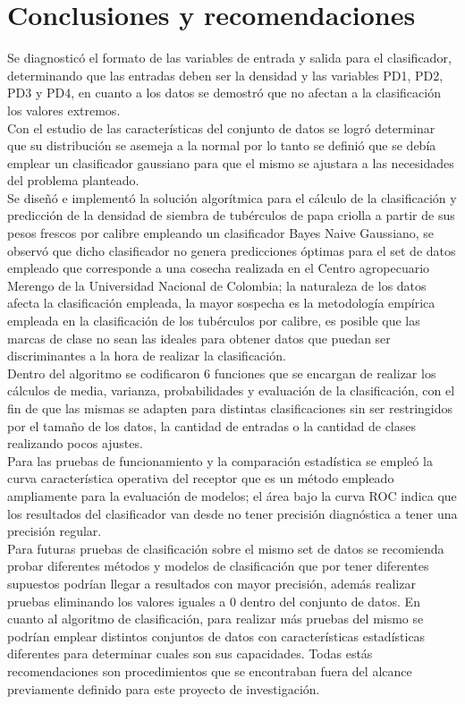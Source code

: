 \chapter{Conclusiones y recomendaciones}

Se diagnosticó el formato de las variables de entrada y salida para el clasificador, determinando que las entradas deben ser la densidad y las variables PD1, PD2, PD3 y PD4, en cuanto a los datos se demostró que no afectan a la clasificación los valores extremos.\\

Con el estudio de las características del conjunto de datos se logró determinar que su distribución se asemeja a la normal por lo tanto se definió que se debía emplear un clasificador gaussiano para que el mismo se ajustara a las necesidades del problema planteado.\\

Se diseñó e implementó la solución algorítmica para el cálculo de la clasificación y predicción de la densidad de siembra de tubérculos de papa criolla a partir de sus pesos frescos por calibre empleando un clasificador Bayes Naive Gaussiano, se observó que dicho clasificador no genera predicciones
óptimas para el set de datos empleado que corresponde a una cosecha realizada en el Centro agropecuario Merengo de la Universidad Nacional de Colombia; la naturaleza de los datos afecta la clasificación empleada, la mayor sospecha es la metodología empírica empleada en la clasificación de los tubérculos por calibre, es posible que las marcas de clase no sean las ideales para obtener datos que puedan ser discriminantes a la hora de realizar la clasificación.\\

Dentro del algoritmo se codificaron 6 funciones que se encargan de realizar los cálculos de media, varianza, probabilidades y evaluación de la clasificación, con el fin de que las mismas se adapten para distintas clasificaciones sin ser restringidos por el tamaño de los datos, la cantidad de entradas o la cantidad de clases realizando pocos ajustes.\\

Para las pruebas de funcionamiento y la comparación estadística se empleó la curva característica operativa del receptor que es un método empleado ampliamente para la evaluación de modelos; el área bajo la curva ROC
indica que los resultados del clasificador van desde no tener precisión diagnóstica a tener una precisión regular.\\

Para futuras pruebas de clasificación sobre el mismo set de datos se recomienda probar diferentes métodos y modelos de clasificación que por tener diferentes supuestos podrían llegar a resultados con mayor precisión, además realizar pruebas eliminando los valores iguales a 0 dentro del conjunto de datos. En cuanto al algoritmo de clasificación, para realizar más pruebas del mismo se podrían emplear distintos conjuntos de datos con características estadísticas diferentes para determinar cuales son sus capacidades. Todas estás recomendaciones son procedimientos que se encontraban fuera del alcance previamente definido para este proyecto de investigación.\\

